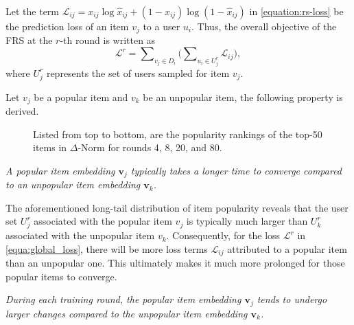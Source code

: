 Let the term $\mathcal{L}_{ij} = x_{ij}\log\hat{x}_{ij} + (1-x_{ij})\log(1-\hat{x}_{ij})$ in \cref{equation:rs-loss} be the prediction loss of an item $v_j$ to a user $u_i$. 
Thus, the overall objective of the FRS at the $r$-th round is written as
\begin{equation}
    \label{equa:global_loss}
    \mathcal{L}^r = \sum\nolimits_{v_j \in {D}_i}\big( \sum\nolimits_{u_i\in {U}_
{j}^{r}}\mathcal{L}_{ij} \big),
\end{equation}
where ${U}_{j}^{r}$ represents the set of users sampled for item $v_j$.

Let $v_j$ be a popular item and $v_k$ be an unpopular item, the following property is derived.

\begin{figure}[tbp]
\centering
    \caption{Listed from top to bottom, are the popularity rankings of the top-50 items in $\Delta$-Norm for rounds 4, 8, 20, and 80.}
    \label{fig:appro-pop-item}
\end{figure}

\begin{property}\label{property_1}
\textit{
A popular item embedding $\mathbf{v}_j$ typically takes a longer time to converge compared to an unpopular item embedding $\mathbf{v}_k$.}
\end{property}

The aforementioned long-tail distribution of item popularity reveals that the user set ${U}_j^{r}$ associated with the popular item $v_j$ is typically much larger than ${U}_k^{r}$ associated with the unpopular item $v_k$.
Consequently, for the loss $\mathcal{L}^r$ in \cref{equa:global_loss}, there will be more loss terms $\mathcal{L}_{ij}$ attributed to a popular item than an unpopular one. This ultimately makes it much more prolonged for those popular items to converge.

\begin{property}\label{property_2}
\textit{
During each training round, the popular item embedding $\mathbf{v}_j$ tends to undergo larger changes compared to the unpopular item embedding $\mathbf{v}_k$.}
\end{property}

